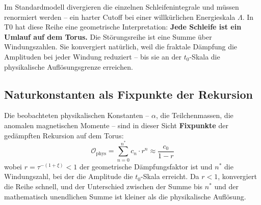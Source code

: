 	Im Standardmodell divergieren die einzelnen Schleifenintegrale und müssen renormiert werden -- ein harter Cutoff bei einer willkürlichen Energieskala $\Lambda$. In T0 hat diese Reihe eine geometrische Interpretation: \textbf{Jede Schleife ist ein Umlauf auf dem Torus.} Die Störungsreihe ist eine Summe über Windungszahlen. Sie konvergiert natürlich, weil die fraktale Dämpfung die Amplituden bei jeder Windung reduziert -- bis sie an der $t_0$-Skala die physikalische Auflösungsgrenze erreichen.
	
	\begin{table}[h]
		\centering
		\caption{Schleifendiagramme im SM vs.\ Windungen in T0}
		\label{tab:schleifen}
	\end{table}
	
	\subsection{Naturkonstanten als Fixpunkte der Rekursion}
	
	Die beobachteten physikalischen Konstanten -- $\alpha$, die Teilchenmassen, die anomalen magnetischen Momente -- sind in dieser Sicht \textbf{Fixpunkte} der gedämpften Rekursion auf dem Torus:
	\begin{equation}
		\mathcal{O}_\text{phys} = \sum_{n=0}^{n^*} c_n \cdot r^n \approx \frac{c_0}{1 - r}
	\end{equation}
	wobei $r = \tau^{-(1+\xi)} < 1$ der geometrische Dämpfungsfaktor ist und $n^*$ die Windungszahl, bei der die Amplitude die $t_0$-Skala erreicht. Da $r < 1$, konvergiert die Reihe schnell, und der Unterschied zwischen der Summe bis $n^*$ und der mathematisch unendlichen Summe ist kleiner als die physikalische Auflösung.
	
